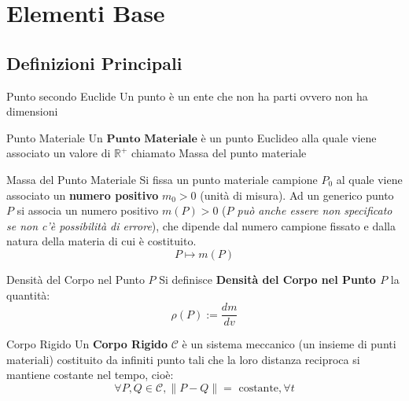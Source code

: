 \documentclass[11pt, a4paper, twoside]{article}
\begin{document}

\tableofcontents
\newpage

\section{Elementi Base}

\subsection{Definizioni Principali}

\begin{defn}{Punto secondo Euclide}{}
	Un punto è un ente che non ha parti ovvero non ha dimensioni
\end{defn}

\begin{defn}{Punto Materiale}{}
	Un $\textbf{Punto Materiale}$ è un punto Euclideo alla quale viene associato un valore di $\mathbb{R}^+$ chiamato Massa del punto materiale
\end{defn}

\begin{defn}{Massa del Punto Materiale}{}
	Si fissa un punto materiale campione $P_0$ al quale viene associato un \textbf{numero positivo} $m_0>0$ (unità di misura). Ad un generico punto $P$ si associa un numero positivo $m(P)>0$ (\textit{$P$ può anche essere non specificato se non c'è possibilità di errore}), che dipende dal numero campione fissato e dalla natura della materia di cui è costituito.
	\[ P \mapsto m(P) \]
\end{defn}

\begin{defn}{Densità del Corpo nel Punto $P$}{}
	Si definisce \textbf{Densità del Corpo nel Punto $P$} la quantità:
	\[\rho(P):= \frac{dm}{dv}\]
\end{defn}

\begin{defn}{Corpo Rigido}{}
	Un \textbf{Corpo Rigido} $\mathscr C$ è un sistema meccanico (un insieme di punti materiali) costituito da infiniti punto tali che la loro distanza reciproca si mantiene costante nel tempo, cioè:
	\[\forall P, Q \in \mathscr C, \|P-Q\| = \text{ costante}, \forall t\]
\end{defn}
\end{document}
